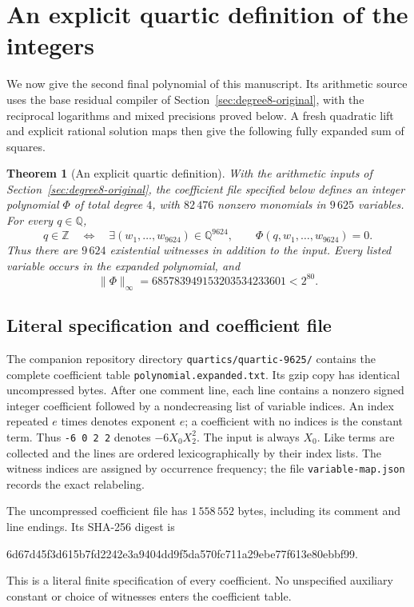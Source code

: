 \documentclass[11pt]{article}
\newtheorem{theorem}{Theorem}[section]
\theoremstyle{definition}
\theoremstyle{remark}
\newcommand{\Q}{\mathbb Q}
\newcommand{\Z}{\mathbb Z}
\begin{document}
\section[An explicit quartic definition]{An explicit quartic definition of the integers}
\label{sec:quartics}

We now give the second final polynomial of this manuscript. Its arithmetic
source uses the base residual compiler of Section~\ref{sec:degree8-original},
with the reciprocal logarithms and mixed precisions proved below. A fresh
quadratic lift and explicit rational solution maps then give the following
fully expanded sum of squares.

\begin{theorem}[An explicit quartic definition]\label{thm:quartic}
With the arithmetic inputs of Section~\ref{sec:degree8-original}, the
coefficient file specified below defines an integer polynomial $\Phi$ of
total degree $4$, with $82\,476$ nonzero monomials in $9\,625$ variables.
For every $q\in\Q$,
\[
 q\in\Z\quad\Longleftrightarrow\quad
 \exists(w_1,\ldots,w_{9624})\in\Q^{9624},\qquad
 \Phi(q,w_1,\ldots,w_{9624})=0.
\]
Thus there are $9\,624$ existential witnesses in addition to the input.
Every listed variable occurs in the expanded polynomial, and
\[
 \|\Phi\|_\infty=685783949153203534233601<2^{80}.
\]
\end{theorem}

\subsection{Literal specification and coefficient file}

The companion repository directory \nolinkurl{quartics/quartic-9625/}
contains the complete coefficient table \nolinkurl{polynomial.expanded.txt}.
Its gzip copy has identical uncompressed bytes. After one comment line,
each line contains a nonzero signed integer coefficient followed by a
nondecreasing list of variable indices. An index repeated $e$ times denotes
exponent $e$; a coefficient with no indices is the constant term. Thus
\texttt{-6 0 2 2} denotes $-6X_0X_2^2$. The input is always $X_0$.
Like terms are collected and the lines are ordered lexicographically by
their index lists. The witness indices are assigned by occurrence frequency;
the file \nolinkurl{variable-map.json} records the exact relabeling.

The uncompressed coefficient file has $1\,558\,552$ bytes, including its
comment and line endings. Its SHA-256 digest is
\begin{center}\footnotesize\ttfamily
6d67d45f3d615b7fd2242e3a9404dd9f5da570fc711a29ebe77f613e80ebbf99.
\end{center}
This is a literal finite specification of every coefficient. No unspecified
auxiliary constant or choice of witnesses enters the coefficient table.
\end{document}
